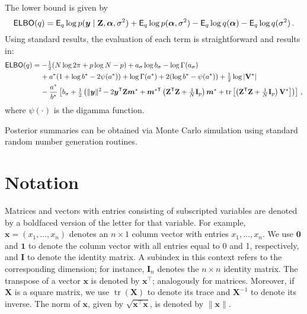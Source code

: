 \documentclass[letterpaper,10pt,openany]{article}
\def\frac#1#2{{{#1}\over{#2}}}
\DeclareMathOperator*{\tr}{tr}
\def\I{\mathbf{I}}\def\i{\mathbf{i}}\def\Iv{\boldsymbol{I}}\def\iv{\boldsymbol{i}}
\def\V{\mathbf{V}}\def\v{\mathbf{v}}\def\Vv{\boldsymbol{V}}\def\vv{\boldsymbol{v}}
\def\X{\mathbf{X}}\def\x{\mathbf{x}}\def\Xv{\boldsymbol{X}}\def\xv{\boldsymbol{x}}
\def\Z{\mathbf{Z}}\def\z{\mathbf{z}}\def\Zv{\boldsymbol{Z}}\def\zv{\boldsymbol{z}}
\def\sig{\sigma}\def\sigv{\boldsymbol{\sigma}}
\def\trans{\text{\textsf{T}}}
\def\zerov{\boldsymbol{0}}
\def\onev{\boldsymbol{1}}
\begin{document}
The lower bound is given by
$$
\textsf{ELBO}(q) = \textsf{E}_q\log p(\yv\mid\Z,\alv,\sig^2) + \textsf{E}_q\log p(\alv,\sig^2) - \textsf{E}_q\log q(\alv) - \textsf{E}_q\log q(\sig^2)\,.
$$
Using standard results, the evaluation of each term is straightforward and results in:
\begin{align*}
\textsf{ELBO}(q) &= -\tfrac{1}{2}(N\log 2\pi + p\log N - p) + a_\sig\log b_\sig - \log\Gamma(a_\sig) \\
&\hspace{0.4cm} + a^*(1 + \log b^* - 2\psi(a^*)) + \log \Gamma(a^*) + 2(\log b^* - \psi(a^*)) + \tfrac12\log|\V^*|\\
&\hspace{0.4cm}-\frac{a^*}{b^*}\left[ b_\sig + \tfrac12 \left( \|\yv\|^2 -2\yv^\trans\Z\mv^* + \mv^{*\trans}\left( \Z^\trans\Z + \tfrac{1}{N}\I_p \right)\mv^* + \tr\left[\left( \Z^\trans\Z + \tfrac{1}{N}\I_p \right) \V^* \right] \right) \right]\,,
\end{align*}
where $\psi(\cdot)$ is the digamma function.	


Posterior summaries can be obtained via Monte Carlo simulation using standard random number generation routines.


{\color{black}
\section{Notation}


Matrices and vectors with entries consisting of subscripted variables are denoted by a boldfaced version of the letter for that variable. For example, $\xv = (x_1,\ldots, x_n)$ denotes an $n\times1$ column vector with entries $x_1,\ldots, x_n$. We use $\zerov$ and $\onev$ to denote the column vector with all entries equal to 0 and 1, respectively, and $\I$ to denote the identity matrix. A subindex in this context refers to the corresponding dimension; for instance, $\I_n$ denotes the $n\times n$ identity matrix.
The transpose of a vector $\xv$ is denoted by $\xv^{\top}$; analogously for matrices.
Moreover, if $\X$ is a square matrix, we use $\tr(\X)$ to denote its trace and $\X^{-1}$ to denote its inverse. The norm of $\xv$, given by $\sqrt{\xv^\top\xv}$, is denoted by $\|\xv\|$.
}
\end{document}
